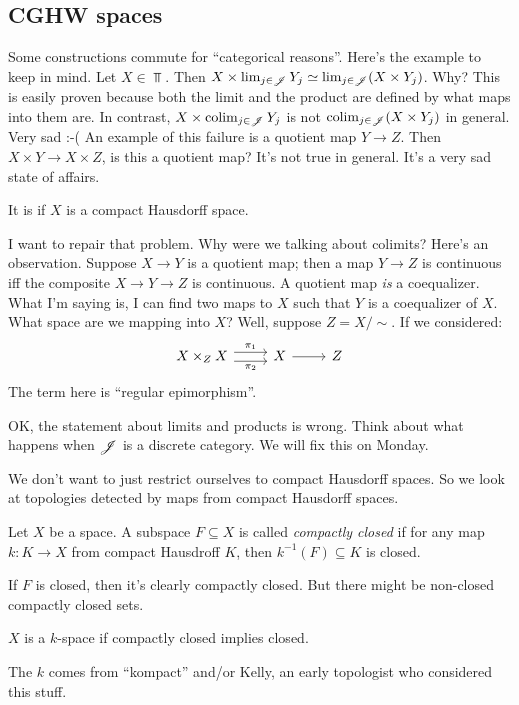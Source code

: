 \subsection{CGHW spaces}
Some constructions commute for ``categorical reasons''. Here's the example to keep in mind. Let $X\in \Top$. Then $X\times\lim_{j\in\mathscr J}Y_j\simeq \lim_{j\in\mathscr J}(X\times Y_j)$. Why? This is easily proven because both the limit and the product are defined by what maps into them are. In contrast, $X\times\operatorname{colim}_{j\in \mathscr J}Y_j$ is not $\operatorname{colim}_{j\in \mathscr J}(X\times Y_j)$ in general. Very sad :-( An example of this failure is a quotient map $Y\to Z$. Then $X\times Y\to X\times Z$, is this a quotient map? It's not true in general. It's a very sad state of affairs.
\begin{theorem}[Whitehead]
    It is if $X$ is a compact Hausdorff space.
\end{theorem}
I want to repair that problem. Why were we talking about colimits? Here's an observation. Suppose $X\to Y$ is a quotient map; then a map $Y\to Z$ is continuous iff the composite $X\to Y\to Z$ is continuous. A quotient map \emph{is} a coequalizer. What I'm saying is, I can find two maps to $X$ such that $Y$ is a coequalizer of $X$. What space are we mapping into $X$? Well, suppose $Z=X/\sim$. If we considered:
\begin{equation*}
    \begin{tikzcd}
	X\times_Z X\ar[r,shift left=.75ex,"\pi_1"]\ar[r,shift right=.75ex,swap,"\pi_2"] & X\ar[r] & Z
    \end{tikzcd}
\end{equation*}
The term here is ``regular epimorphism''.

\begin{remark}
    OK, the statement about limits and products is wrong. Think about what happens when $\mathscr J$ is a discrete category. We will fix this on Monday.
\end{remark}

We don't want to just restrict ourselves to compact Hausdorff spaces. So we look at topologies detected by maps from compact Hausdorff spaces.
\begin{definition}
    Let $X$ be a space. A subspace $F\subseteq X$ is called \emph{compactly closed} if for any map $k:K\to X$ from compact Hausdroff $K$, then $k^{-1}(F)\subseteq K$ is closed.
\end{definition}
If $F$ is closed, then it's clearly compactly closed. But there might be non-closed compactly closed sets.
\begin{definition}
    $X$ is a $k$-space if compactly closed implies closed.
\end{definition}
The $k$ comes from ``kompact'' and/or Kelly, an early topologist who considered this stuff.

